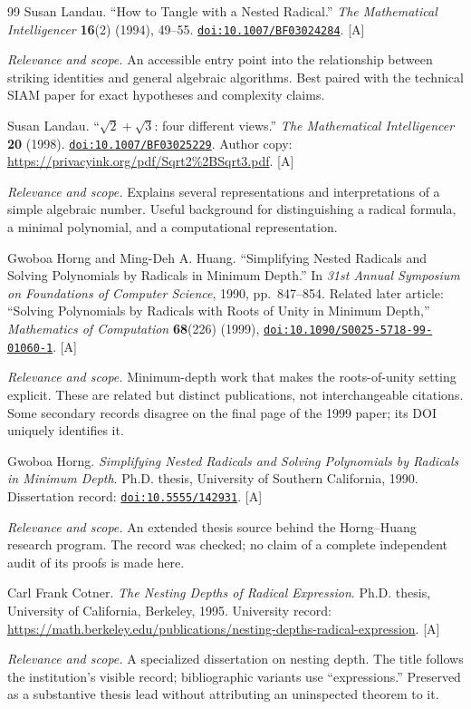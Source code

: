 \documentclass[11pt,oneside]{article}
\numberwithin{equation}{section}
\theoremstyle{definition}
\theoremstyle{remark}
\newcommand{\doi}[1]{\href{https://doi.org/#1}{\nolinkurl{doi:#1}}}
\newcommand{\status}[1]{\textsf{\small[#1]}}
\newcommand{\entrynote}[1]{\par\smallskip\noindent\emph{Relevance and scope.} #1}
\begin{document}
\begin{thebibliography}{99}
Susan Landau. ``How to Tangle with a Nested Radical.'' \emph{The Mathematical Intelligencer} \textbf{16}(2) (1994), 49--55. \doi{10.1007/BF03024284}. \status{A}
\entrynote{An accessible entry point into the relationship between striking identities and general algebraic algorithms. Best paired with the technical SIAM paper for exact hypotheses and complexity claims.}

Susan Landau. ``$\sqrt{2}+\sqrt{3}$: four different views.'' \emph{The Mathematical Intelligencer} \textbf{20} (1998). \doi{10.1007/BF03025229}. Author copy: \url{https://privacyink.org/pdf/Sqrt2%2BSqrt3.pdf}. \status{A}
\entrynote{Explains several representations and interpretations of a simple algebraic number. Useful background for distinguishing a radical formula, a minimal polynomial, and a computational representation.}

Gwoboa Horng and Ming-Deh A. Huang. ``Simplifying Nested Radicals and Solving Polynomials by Radicals in Minimum Depth.'' In \emph{31st Annual Symposium on Foundations of Computer Science}, 1990, pp.~847--854. Related later article: ``Solving Polynomials by Radicals with Roots of Unity in Minimum Depth,'' \emph{Mathematics of Computation} \textbf{68}(226) (1999), \doi{10.1090/S0025-5718-99-01060-1}. \status{A}
\entrynote{Minimum-depth work that makes the roots-of-unity setting explicit. These are related but distinct publications, not interchangeable citations. Some secondary records disagree on the final page of the 1999 paper; its DOI uniquely identifies it.}

Gwoboa Horng. \emph{Simplifying Nested Radicals and Solving Polynomials by Radicals in Minimum Depth}. Ph.D. thesis, University of Southern California, 1990. Dissertation record: \doi{10.5555/142931}. \status{A}
\entrynote{An extended thesis source behind the Horng--Huang research program. The record was checked; no claim of a complete independent audit of its proofs is made here.}

Carl Frank Cotner. \emph{The Nesting Depths of Radical Expression}. Ph.D. thesis, University of California, Berkeley, 1995. University record: \url{https://math.berkeley.edu/publications/nesting-depths-radical-expression}. \status{A}
\entrynote{A specialized dissertation on nesting depth. The title follows the institution's visible record; bibliographic variants use ``expressions.'' Preserved as a substantive thesis lead without attributing an uninspected theorem to it.}


\end{thebibliography}
\end{document}
